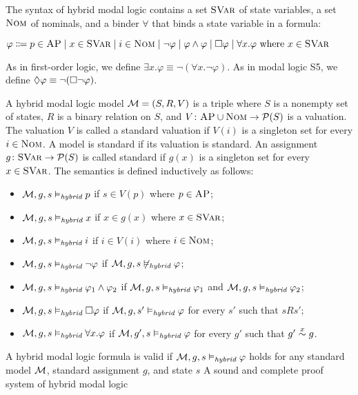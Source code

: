 \documentclass{amsart}
\begin{document}
The syntax of hybrid modal logic contains
a set ${\normalfont\textsc{SVar}}$ of state variables,
a set $\textnormal{\textsc{Nom}}$ of nominals,
and a binder $\forall$ that binds a state variable in a formula:
\begin{center}
$\varphi \Coloneqq
p \in \textsc{AP} \mid x \in {\normalfont\textsc{SVar}} \mid i \in \textnormal{\textsc{Nom}} \mid
\neg \varphi \mid \varphi \wedge \varphi \mid
{\square} \varphi \mid \forall x . \varphi \text{ where $x \in {\normalfont\textsc{SVar}}$}
	$
\end{center}
As in first-order logic,
we define $\exists x . \varphi \equiv \neg (\forall x . \neg \varphi)$.
As in modal logic S5,
we define ${\lozenge} \varphi \equiv \neg ({\square} \neg \varphi)$.

A hybrid modal logic model
$\mathcal{M} = (S, R, V)$ is a triple where
$S$ is a nonempty set of states,
$R$ is a binary relation on $S$,
and $V \colon \textsc{AP} \cup \textnormal{\textsc{Nom}} \to \mathcal{P}(S)$ is a valuation.
The valuation $V$ is called a standard valuation if $V(i)$ is a singleton set
for every $i \in \textnormal{\textsc{Nom}}$.
A model is standard if its valuation is standard.
An assignment $g \colon {\normalfont\textsc{SVar}} \to \mathcal{P}(S)$ is called standard
if $g(x)$ is a singleton set for every $x \in {\normalfont\textsc{SVar}}$.
The semantics is defined inductively as follows:
\begin{itemize}
\item $\mathcal{M},g,s \vDash_{\textit{hybrid}} p$
      if $s \in V(p)$ where $p \in \textsc{AP}$;
\item $\mathcal{M},g,s \vDash_{\textit{hybrid}} x$
      if $x \in g(x)$ where $x \in {\normalfont\textsc{SVar}}$;
\item $\mathcal{M},g,s \vDash_{\textit{hybrid}} i$
      if $i \in V(i)$ where $i \in \textnormal{\textsc{Nom}}$;
\item $\mathcal{M},g,s \vDash_{\textit{hybrid}} \neg \varphi$
      if $\mathcal{M},g,s \not \vDash_{\textit{hybrid}} \varphi$;
\item $\mathcal{M},g,s \vDash_{\textit{hybrid}} \varphi_1 \wedge \varphi_2$
      if  $\mathcal{M},g,s \vDash_{\textit{hybrid}} \varphi_1$
      and $\mathcal{M},g,s \vDash_{\textit{hybrid}} \varphi_2$;
\item $\mathcal{M},g,s \vDash_{\textit{hybrid}} {\square} \varphi$
      if $\mathcal{M},g,s' \vDash_{\textit{hybrid}} \varphi$
      for every $s'$ such that $s R s'$;
\item $\mathcal{M},g,s \vDash_{\textit{hybrid}} \forall x . \varphi$
      if $\mathcal{M},g',s \vDash_{\textit{hybrid}} \varphi$
      for every $g'$ such that $g' \overset{x}{\sim} g$.
\end{itemize}
A hybrid modal logic formula is valid
if $\mathcal{M},g,s \vDash_{\textit{hybrid}} \varphi$ 
holds for any standard model $\mathcal{M}$, standard assignment $g$, and state $s$
A sound and complete proof system of hybrid modal logic
\end{document}
